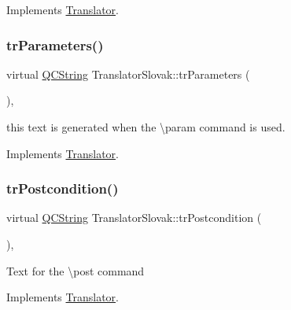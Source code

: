 Implements \mbox{\hyperlink{class_translator}{Translator}}.

\mbox{\label{class_translator_slovak_abba750aabba322c3ebc95eb2f9820f2f}} 
\subsubsection{\texorpdfstring{trParameters()}{trParameters()}}
{\footnotesize\ttfamily virtual \mbox{\hyperlink{class_q_c_string}{Q\+C\+String}} Translator\+Slovak\+::tr\+Parameters (\begin{DoxyParamCaption}{ }\end{DoxyParamCaption})\hspace{0.3cm}{\ttfamily [inline]}, {\ttfamily [virtual]}}

this text is generated when the \textbackslash{}param command is used. 

Implements \mbox{\hyperlink{class_translator}{Translator}}.

\mbox{\label{class_translator_slovak_a534e793ed7e9fd9a18d17f7cda466db1}} 
\subsubsection{\texorpdfstring{trPostcondition()}{trPostcondition()}}
{\footnotesize\ttfamily virtual \mbox{\hyperlink{class_q_c_string}{Q\+C\+String}} Translator\+Slovak\+::tr\+Postcondition (\begin{DoxyParamCaption}{ }\end{DoxyParamCaption})\hspace{0.3cm}{\ttfamily [inline]}, {\ttfamily [virtual]}}

Text for the \textbackslash{}post command 

Implements \mbox{\hyperlink{class_translator}{Translator}}.

\mbox{\label{class_translator_slovak_a3f2025f9a0a51a68059f17bd3787b90a}} 
